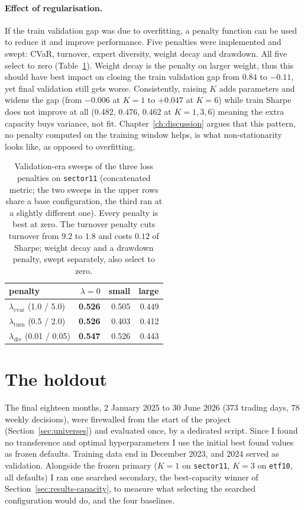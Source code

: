 \paragraph{Effect of regularisation.}
If the train validation gap was due to overfitting, a penalty function can be used to reduce it and improve performance. Five penalties were implemented and swept: CVaR, turnover, expert diversity, weight decay and drawdown. All five select to zero (Table~\ref{tab:penalty}). Weight decay is the penalty on larger weight, thus this should have best impact on closing the train validation gap from $0.84$ to $-0.11$, yet final validation still gets worse. Consistently, raising $K$ adds parameters and widens the gap (from $-0.006$ at $K=1$ to $+0.047$ at $K=6$) while train Sharpe does not improve at all ($0.482$, $0.476$, $0.462$ at $K=1,3,6$) meaning the extra capacity buys variance, not fit.
Chapter~\ref{ch:discussion} argues that this pattern, no penalty computed on
the training window helps, is what non-stationarity looks like, as opposed to
overfitting.

\begin{table}[t]
  \centering
  \small
  \begin{tabular}{l rrr}
    \hline
    penalty & $\lambda=0$ & small & large \\
    \hline
    $\lambda_{\text{cvar}}$ (1.0 / 5.0)   & \textbf{0.526} & 0.505 & 0.449 \\
    $\lambda_{\text{turn}}$ (0.5 / 2.0)   & \textbf{0.526} & 0.403 & 0.412 \\
    $\lambda_{\text{div}}$ (0.01 / 0.05)  & \textbf{0.547} & 0.526 & 0.443 \\
    \hline
  \end{tabular}
  \caption[Loss penalties select to zero]{Validation-era sweeps of the three
  loss penalties on \texttt{sector11} (concatenated metric; the two sweeps in
  the upper rows share a base configuration, the third ran at a slightly
  different one). Every penalty is best at zero. The turnover penalty cuts
  turnover from $9.2$ to $1.8$ and costs $0.12$ of Sharpe; weight decay and a
  drawdown penalty, swept separately, also select to zero.}
  \label{tab:penalty}
\end{table}


\section{The holdout}
\label{sec:results-holdout}

The final eighteen months, 2 January 2025 to 30 June 2026 ($373$ trading days, $78$ weekly decisions), were firewalled from the start of the project (Section~\ref{sec:universes}) and evaluated once, by a dedicated script. Since I found no transference and optimal hyperparameters I use the initial best found values as frozen defaults. Training data end in December 2023, and 2024 served as validation. Alongside the frozen primary ($K=1$ on \texttt{sector11}, $K=3$ on \texttt{etf10}, all defaults) I ran one searched secondary, the best-capacity winner of Section~\ref{sec:results-capacity}, to measure what selecting the searched configuration would do, and the four baselines.

